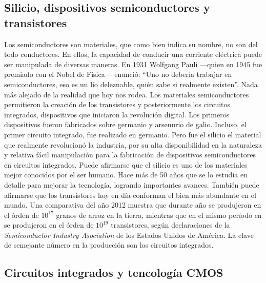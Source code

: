 \subsection{Silicio, dispositivos semiconductores y transistores}
\label{subsec:theory-history-semiconductors}

Los semiconductores son materiales, que como bien indica su nombre, no son del
todo conductores. En ellos, la capacidad de conducir una corriente eléctrica
puede ser manipulada de diversas maneras. En 1931 Wolfgang Pauli ---quien en 
1945 fue premiado con el Nobel de Física--- enunció: ``Uno no debería trabajar 
en semiconductores, eso es un lío deleznable, quién sabe si realmente existen''.
Nada más alejado de la realidad que hoy nos rodea. Los materiales
semiconductores permitieron la creación de los transistores y posteriormente los
circuitos integrados, dispositivos que iniciaron la revolución digital. Los
primeros dispositivos fueron fabricados sobre germanio y arsenurio de galio.
Incluso, el primer circuito integrado, fue realizado en germanio. Pero fue el 
silicio el material que realmente revolucionó la industria, por su alta
disponibilidad en la naturaleza y relativa fácil manipulación para la
fabricación de dispositivos semiconductores en circuitos integrados. Puede
afirmarse que el silicio es uno de los materiales mejor conocidos por el ser
humano. Hace más de 50 años que se lo estudia en detalle para mejorar la
tecnología, logrando importantes avances. También puede afirmarse que los
transistores hoy en día conforman el bien más abundante en el mundo. Una
comparativa del año 2012 muestra que durante año se produjeron en el órden de
$10^{17}$ granos de arroz en la tierra, mientras que en el mismo período en se
produjeron en el órden de $10^{19}$ transistores, según declaraciones de la
\emph{Semiconductor Industry Asociation} de los Estados Unidos de América. La
clave de semejante número en la producción son los circuitos integrados.

\subsection{Circuitos integrados y tencología CMOS}
\label{subsec:theory-history-ic}

